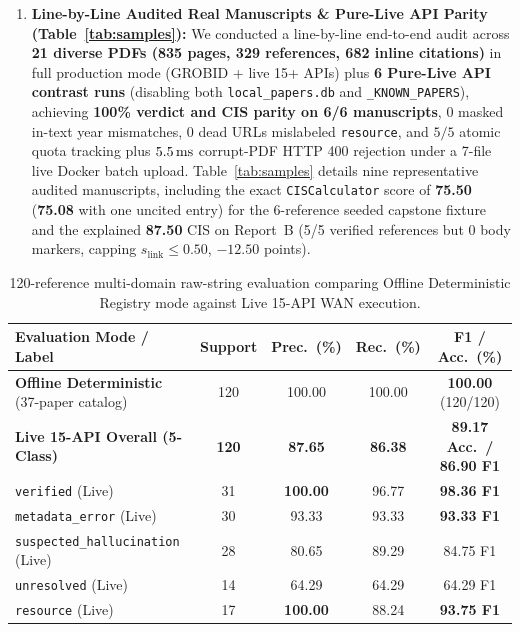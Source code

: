 \begin{enumerate}
    \item \textbf{Line-by-Line Audited Real Manuscripts \& Pure-Live API Parity (Table~\ref{tab:samples}):} We conducted a line-by-line end-to-end audit across \textbf{21 diverse PDFs (835 pages, 329 references, 682 inline citations)} in full production mode (GROBID + live 15+ APIs) plus \textbf{6 Pure-Live API contrast runs} (disabling both \texttt{local\_papers.db} and \texttt{\_KNOWN\_PAPERS}), achieving \textbf{100\% verdict and CIS parity on 6/6 manuscripts}, $0$ masked in-text year mismatches, $0$ dead URLs mislabeled \texttt{resource}, and $5/5$ atomic quota tracking plus $5.5\text{\,ms}$ corrupt-PDF HTTP 400 rejection under a 7-file live Docker batch upload. Table~\ref{tab:samples} details nine representative audited manuscripts, including the exact \texttt{CISCalculator} score of \textbf{75.50} (\textbf{75.08} with one uncited entry) for the 6-reference seeded capstone fixture and the explained \textbf{87.50} CIS on Report~B (5/5 verified references but 0 body markers, capping $s_{\text{link}} \le 0.50$, $-12.50$ points).
\end{enumerate}

{\setlength{\tabcolsep}{3.5pt}
\begin{table}[!htbp]
\centering
\caption{120-reference multi-domain raw-string evaluation comparing Offline Deterministic Registry mode against Live 15-API WAN execution.}\label{tab:e2e-gold}
\begin{tabular}{|L{0.34}|C{0.15}|C{0.15}|C{0.18}|C{0.18}|}
\hline
\textbf{Evaluation Mode / Label} & \textbf{Support} & \textbf{Prec.\ (\%)} & \textbf{Rec.\ (\%)} & \textbf{F1 / Acc.\ (\%)} \\
\hline
\textbf{Offline Deterministic} (37-paper catalog) & 120 & 100.00 & 100.00 & \textbf{100.00} (120/120) \\
\hline
\textbf{Live 15-API Overall (5-Class)} & \textbf{120} & \textbf{87.65} & \textbf{86.38} & \textbf{89.17 Acc.\ / 86.90 F1} \\
\hline
\quad \texttt{verified} (Live) & 31 & \textbf{100.00} & 96.77 & \textbf{98.36 F1} \\
\hline
\quad \texttt{metadata\_error} (Live) & 30 & 93.33 & 93.33 & \textbf{93.33 F1} \\
\hline
\quad \texttt{suspected\_hallucination} (Live) & 28 & 80.65 & 89.29 & 84.75 F1 \\
\hline
\quad \texttt{unresolved} (Live) & 14 & 64.29 & 64.29 & 64.29 F1 \\
\hline
\quad \texttt{resource} (Live) & 17 & \textbf{100.00} & 88.24 & \textbf{93.75 F1} \\
\hline
\end{tabular}
\end{table}
}

